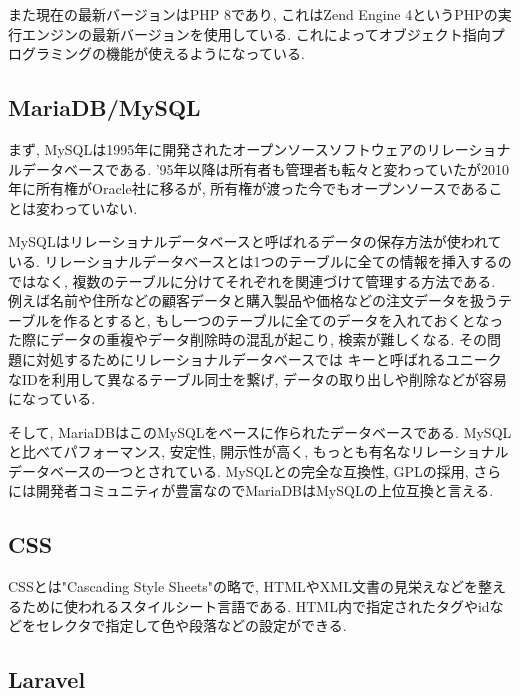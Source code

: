 \documentclass[submit,techrep]{ipsj}
\begin{document}
また現在の最新バージョンはPHP 8であり, これはZend Engine 4というPHPの実行エンジンの最新バージョンを使用している. これによってオブジェクト指向プログラミングの機能が使えるようになっている. 

\subsection{MariaDB/MySQL}
まず, MySQLは1995年に開発されたオープンソースソフトウェアのリレーショナルデータベースである. 
'95年以降は所有者も管理者も転々と変わっていたが2010年に所有権がOracle社に移るが, 所有権が渡った今でもオープンソースであることは変わっていない.

MySQLはリレーショナルデータベースと呼ばれるデータの保存方法が使われている. リレーショナルデータベースとは1つのテーブルに全ての情報を挿入するのではなく, 複数のテーブルに分けてそれぞれを関連づけて管理する方法である. 
例えば名前や住所などの顧客データと購入製品や価格などの注文データを扱うテーブルを作るとすると, もし一つのテーブルに全てのデータを入れておくとなった際にデータの重複やデータ削除時の混乱が起こり, 検索が難しくなる. その問題に対処するためにリレーショナルデータベースでは
キーと呼ばれるユニークなIDを利用して異なるテーブル同士を繋げ, データの取り出しや削除などが容易になっている. 

そして, MariaDBはこのMySQLをベースに作られたデータベースである. MySQLと比べてパフォーマンス, 安定性, 開示性が高く, もっとも有名なリレーショナルデータベースの一つとされている. MySQLとの完全な互換性, GPLの採用, さらには開発者コミュニティが豊富なのでMariaDBはMySQLの上位互換と言える. 
\subsection{CSS}
CSSとは"Cascading Style Sheets"の略で, HTMLやXML文書の見栄えなどを整えるために使われるスタイルシート言語である. 
HTML内で指定されたタグやidなどをセレクタで指定して色や段落などの設定ができる. 

\subsection{Laravel}



\end{document}
